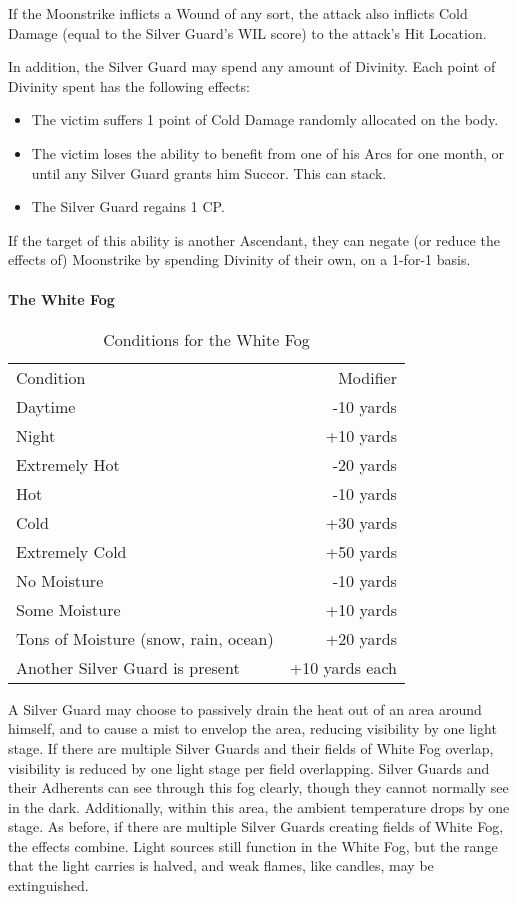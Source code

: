 \documentclass[oneside,11pt,english]{book}
\begin{document}
If the Moonstrike inflicts a Wound of any sort, the attack also inflicts Cold Damage (equal to the 
Silver Guard's WIL score) to the attack’s Hit Location. 


In addition, the Silver Guard may spend any amount of Divinity. Each point of Divinity spent has 
the following effects: 
\begin{itemize}
\item The victim suffers 1 point of Cold Damage randomly allocated on the body. 
\item The victim loses the ability to benefit from one of his Arcs for one month, or until any 
Silver Guard grants him Succor. This can stack. 
\item The Silver Guard regains 1 CP. 
\end{itemize}
If the target of this ability is another Ascendant, they can negate (or reduce the effects of) Moonstrike by spending Divinity of their own, on a 1-for-1 basis. 
\paragraph{The White Fog} %
	\setlength{\intextsep}{0pt}
\begin{wraptable}{r}{9 cm}
	\caption{Conditions for the White Fog}
	\label{tab:Dessian White Fog}
	\begin{tabu} spread 0pt {Xr}
		Condition&Modifier\\
		Daytime&-10 yards\\
		Night&+10 yards\\
		Extremely Hot&-20 yards \\
		Hot&-10 yards \\
		Cold&+30 yards \\
		Extremely Cold&+50 yards \\
		No Moisture&-10 yards \\
		Some Moisture&+10 yards \\
		Tons of Moisture (snow, rain, ocean)&+20 yards \\
		Another Silver Guard is present&+10 yards each \\
	\end{tabu}
\end{wraptable}
	\setlength{\intextsep}{\oldintextsep}
A Silver Guard may choose to passively drain the heat out of an area around himself, and to cause 
a mist to envelop the area, reducing visibility by one light stage. If there are multiple Silver 
Guards and their fields of White Fog overlap, visibility is reduced by one light stage per field 
overlapping. Silver Guards and their Adherents can see through this fog clearly, though they 
cannot normally see in the dark. Additionally, within this area, the ambient temperature drops by 
one stage. As before, if there are multiple Silver Guards creating fields of White Fog, the effects 
combine. Light sources still function in the White Fog, but the range that the light carries is 
halved, and weak flames, like candles, may be extinguished. 
\end{document}
